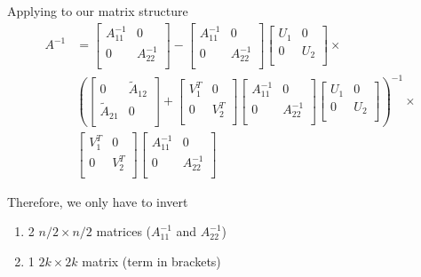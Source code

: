Applying to our matrix structure
\begin{align*}
    A^{-1} &=
    \begin{bmatrix}
       A_{11}^{-1} & 0 \\
       0 & A_{22}^{-1} \\
    \end{bmatrix}
    -
    \begin{bmatrix}
       A_{11}^{-1} & 0 \\
       0 & A_{22}^{-1} \\
    \end{bmatrix}
    \begin{bmatrix}
       U_1 & 0 \\
       0 & U_2 \\
    \end{bmatrix}
    \times\\
    &\left(
    \begin{bmatrix}
       0 & \widetilde{A}_{12} \\
       \widetilde{A}_{21}& 0 \\
    \end{bmatrix}
    +
    \begin{bmatrix}
       V_1^T & 0 \\
       0 & V_2^T \\
    \end{bmatrix}
    \begin{bmatrix}
       A_{11}^{-1} & 0 \\
       0 & A_{22}^{-1} \\
    \end{bmatrix}
    \begin{bmatrix}
       U_1 & 0 \\
       0 & U_2 \\
    \end{bmatrix}
    \right)^{-1}
    \times \\
    &
    \begin{bmatrix}
       V_1^T & 0 \\
       0 & V_2^T \\
    \end{bmatrix}
    \begin{bmatrix}
       A_{11}^{-1} & 0 \\
       0 & A_{22}^{-1} \\
    \end{bmatrix}
\end{align*}

Therefore, we only have to invert
\begin{enumerate}[1)]
    \item 2 $n/2 \times n/2$ matrices ($A_{11}^{-1}$ and $A_{22}^{-1}$)
    \item 1 $2k \times 2k$ matrix (term in brackets)
\end{enumerate}

